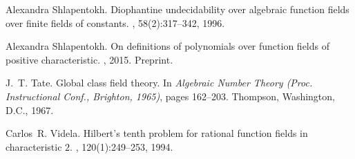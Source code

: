 \documentclass[12pt,reqno]{amsart}
\theoremstyle{definition}
\begin{document}
\begin{thebibliography}{CTVG15}
Alexandra Shlapentokh.
\newblock Diophantine undecidability over algebraic function fields over finite
  fields of constants.
, 58(2):317--342, 1996.

Alexandra Shlapentokh.
\newblock On definitions of polynomials over function fields of positive
  characteristic.
, 2015.
\newblock Preprint.

J.~T. Tate.
\newblock Global class field theory.
\newblock In {\em Algebraic {N}umber {T}heory ({P}roc. {I}nstructional {C}onf.,
  {B}righton, 1965)}, pages 162--203. Thompson, Washington, D.C., 1967.

Carlos~R. Videla.
\newblock Hilbert's tenth problem for rational function fields in
  characteristic $2$.
, 120(1):249--253, 1994.

\end{thebibliography}
\end{document}
